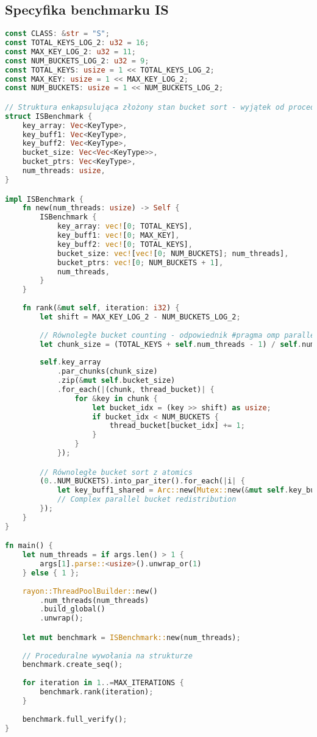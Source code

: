 \subsection{Specyfika benchmarku IS}
\begin{lstlisting}[language=Rust, caption={Implementacja benchmarku IS w języku Rust}, label={lst:is_rust}]
const CLASS: &str = "S";
const TOTAL_KEYS_LOG_2: u32 = 16;
const MAX_KEY_LOG_2: u32 = 11;
const NUM_BUCKETS_LOG_2: u32 = 9;
const TOTAL_KEYS: usize = 1 << TOTAL_KEYS_LOG_2;
const MAX_KEY: usize = 1 << MAX_KEY_LOG_2;
const NUM_BUCKETS: usize = 1 << NUM_BUCKETS_LOG_2;

// Struktura enkapsulująca złożony stan bucket sort - wyjątek od proceduralnej reguły
struct ISBenchmark {
    key_array: Vec<KeyType>,
    key_buff1: Vec<KeyType>,
    key_buff2: Vec<KeyType>,
    bucket_size: Vec<Vec<KeyType>>,
    bucket_ptrs: Vec<KeyType>,
    num_threads: usize,
}

impl ISBenchmark {
    fn new(num_threads: usize) -> Self {
        ISBenchmark {
            key_array: vec![0; TOTAL_KEYS],
            key_buff1: vec![0; MAX_KEY],
            key_buff2: vec![0; TOTAL_KEYS],
            bucket_size: vec![vec![0; NUM_BUCKETS]; num_threads],
            bucket_ptrs: vec![0; NUM_BUCKETS + 1],
            num_threads,
        }
    }
    
    fn rank(&mut self, iteration: i32) {
        let shift = MAX_KEY_LOG_2 - NUM_BUCKETS_LOG_2;
        
        // Równoległe bucket counting - odpowiednik #pragma omp parallel for
        let chunk_size = (TOTAL_KEYS + self.num_threads - 1) / self.num_threads;
        
        self.key_array
            .par_chunks(chunk_size)
            .zip(&mut self.bucket_size)
            .for_each(|(chunk, thread_bucket)| {
                for &key in chunk {
                    let bucket_idx = (key >> shift) as usize;
                    if bucket_idx < NUM_BUCKETS {
                        thread_bucket[bucket_idx] += 1;
                    }
                }
            });

        // Równoległe bucket sort z atomics
        (0..NUM_BUCKETS).into_par_iter().for_each(|i| {
            let key_buff1_shared = Arc::new(Mutex::new(&mut self.key_buff1));
            // Complex parallel bucket redistribution
        });
    }
}

fn main() {
    let num_threads = if args.len() > 1 {
        args[1].parse::<usize>().unwrap_or(1)
    } else { 1 };
    
    rayon::ThreadPoolBuilder::new()
        .num_threads(num_threads)
        .build_global()
        .unwrap();

    let mut benchmark = ISBenchmark::new(num_threads);
    
    // Proceduralne wywołania na strukturze
    benchmark.create_seq();
    
    for iteration in 1..=MAX_ITERATIONS {
        benchmark.rank(iteration);
    }
    
    benchmark.full_verify();
}
\end{lstlisting}
